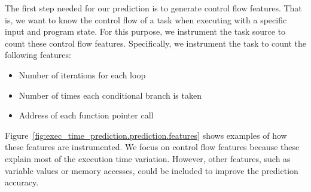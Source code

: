 The first step needed for our prediction is to generate control flow features.
That is, we want to know the control flow of a task when executing with a
specific input and program state.  For this purpose, we instrument the task
source to count these control flow features.  Specifically, we instrument the
task to count the following features:
\begin{itemize}
  \item Number of iterations for each loop
  \item Number of times each conditional branch is taken
  \item Address of each function pointer call
\end{itemize}
Figure~\ref{fig:exec_time_prediction.prediction.features} shows examples of how
these features are instrumented.  We focus on control flow features because
these explain most of the execution time variation. However, other features,
such as variable values or memory accesses, could be included to improve the
prediction accuracy.

